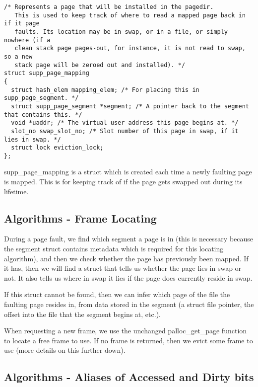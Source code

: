 \begin{verbatim}
/* Represents a page that will be installed in the pagedir.
   This is used to keep track of where to read a mapped page back in if it page
   faults. Its location may be in swap, or in a file, or simply nowhere (if a
   clean stack page pages-out, for instance, it is not read to swap, so a new
   stack page will be zeroed out and installed). */
struct supp_page_mapping
{
  struct hash_elem mapping_elem; /* For placing this in supp_page_segment. */
  struct supp_page_segment *segment; /* A pointer back to the segment that contains this. */
  void *uaddr; /* The virtual user address this page begins at. */
  slot_no swap_slot_no; /* Slot number of this page in swap, if it lies in swap. */
  struct lock eviction_lock;
};
\end{verbatim}

supp\_page\_mapping is a struct which is created each time a newly faulting page
is mapped. This is for keeping track of if the page gets swapped out during its
lifetime.

\subsection{Algorithms - Frame Locating}


During a page fault, we find which segment a page is in (this is necessary
because the segment struct contains metadata which is required for this locating
algorithm), and then we check whether the page has previously been mapped. If it
has, then we will find a struct that tells us whether the page lies in swap or
not. It also tells us where in swap it lies if the page does currently reside in
swap.

If this struct cannot be found, then we can infer which page of the file the
faulting page resides in, from data stored in the segment (a struct file
pointer, the offset into the file that the segment begins at, etc.).

When requesting a new frame, we use the unchanged palloc\_get\_page function to
locate a free frame to use. If no frame is returned, then we evict some frame to
use (more details on this further down).

\subsection{Algorithms - Aliases of Accessed and Dirty bits}

